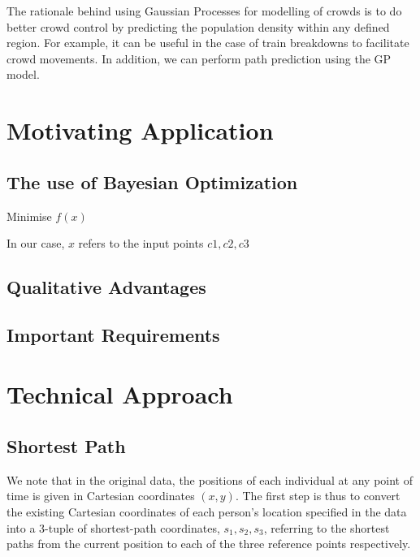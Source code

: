 \documentclass[letterpaper]{article}
\begin{document}
The rationale behind using Gaussian Processes for modelling of crowds is to do better crowd control by predicting the population density within any defined region. For example, it can be useful in the case of train breakdowns to facilitate crowd movements. In addition, we can perform path prediction using the GP model.

\section{Motivating Application}



\subsection{The use of Bayesian Optimization}

Minimise $f(x)$

In our case, $x$ refers to the input points $c1, c2, c3$

\subsection{Qualitative Advantages}



\subsection{Important Requirements}



\section{Technical Approach}



\subsection{Shortest Path}

We note that in the original data, the positions of each individual at any point of time is given in Cartesian coordinates $(x,y)$. The first step is thus to convert the existing Cartesian coordinates of each person's location specified in the data into a 3-tuple of shortest-path coordinates, $s_1, s_2, s_3$, referring to the shortest paths from the current position to each of the three reference points respectively.\\
\end{document}
